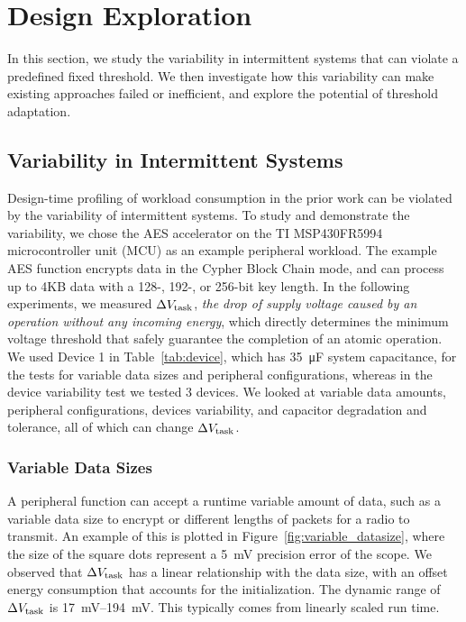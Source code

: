 \section{Design Exploration} 
\label{sec:design_exploration}

In this section, we study the variability in intermittent systems that can violate a predefined fixed threshold. 
We then investigate how this variability can make existing approaches failed or inefficient, and explore the potential of threshold adaptation. 

\subsection{Variability in Intermittent Systems} 
\label{subsec:dynamic_energy_consumption}
 
Design-time profiling of workload consumption in the prior work can be violated by the variability of intermittent systems.
To study and demonstrate the variability, we chose the AES accelerator on the TI MSP430FR5994 microcontroller unit (MCU) as an example peripheral workload.  
The example AES function encrypts data in the Cypher Block Chain mode, and can process up to 4KB data with a 128-, 192-, or 256-bit key length. 
In the following experiments, we measured $\Delta V_{\text{task}}$, \textit{the drop of supply voltage caused by an operation without any incoming energy}, which directly determines the minimum voltage threshold that safely guarantee the completion of an atomic operation. 
We used Device 1 in Table~\ref{tab:device}, which has \SI{35}{\micro\farad} system capacitance, for the tests for variable data sizes and peripheral configurations, whereas in the device variability test we tested 3 devices.
We looked at variable data amounts, peripheral configurations, devices variability, and capacitor degradation and tolerance, all of which can change $\Delta V_{\text{task}}$. 



\subsubsection{Variable Data Sizes}

A peripheral function can accept a runtime variable amount of data, such as a variable data size to encrypt or different lengths of packets for a radio to transmit. 
An example of this is plotted in Figure~\ref{fig:variable_datasize}, where the size of the square dots represent a \SI{5}{\milli\volt} precision error of the scope. 
We observed that $\Delta V_{\text{task}}$ has a linear relationship with the data size, with an offset energy consumption that accounts for the initialization. 
The dynamic range of $\Delta V_{\text{task}}$ is \SIrange{17}{194}{\milli\volt}.
This typically comes from linearly scaled run time. 

